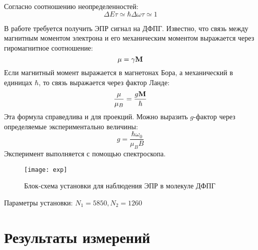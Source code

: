 \documentclass[a4paper,12pt]{article}
\begin{document}
    Согласно соотношению неопределенностей:
    \begin{equation}
       \Delta E \tau \simeq \hbar \Delta\omega\tau \simeq 1
    \end{equation}
	
        В работе требуется получить ЭПР сигнал на ДФПГ. Известно, что связь между магнитным моментом электрона и его механическим моментом выражается через гиромагнитное соотношение:
        \begin{equation}
            \bf{\mu} = \gamma\bf{M}
        \end{equation}
        Если магнитный момент выражается в магнетонах Бора, а механический в единицах $\hbar$, то связь выражается через фактор Ланде:
        \begin{equation}
            \frac{\bf{\mu}}{\mu_B} = \frac{g\bf{M}}{\hbar}
        \end{equation}
        \newline
        Эта формула справедлива и для проекций. Можно выразить $g$-фактор через определяемые экспериментально величины:
        \begin{equation}
            g = \frac{\hbar\omega_0}{\mu_B B}
        \end{equation}
        Эксперимент выполняется с помощью спектроскопа.
        \begin{figure}[h!]
			\centering
			\texttt{[image: exp]}
			\caption{Блок-схема установки для наблюдения ЭПР в молекуле ДФПГ}
		\end{figure}        
		
		Параметры установки: $N_1 = 5850, N_2 = 1260$
		
    \newpage
    \section{Результаты измерений}
    
\end{document}
